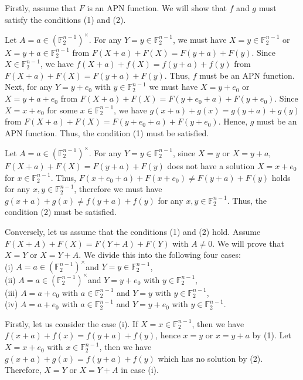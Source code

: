 \documentclass[10pt]{article}
\begin{document}
Firstly, assume that $F$ is an APN function. We will show that $f$ and $g$ must satisfy the conditions (1) and (2).

Let $A=a \in\left(\mathbb{F}_{2}^{n-1}\right)^{\times}$. For any $Y=y \in \mathbb{F}_{2}^{n-1}$, we must have $X=y \in \mathbb{F}_{2}^{n-1}$ or $X=y+a \in \mathbb{F}_{2}^{n-1}$ from $F(X+a)+F(X)=F(y+a)+F(y)$. Since $X \in \mathbb{F}_{2}^{n-1}$, we have $f(X+a)+f(X)=f(y+a)+f(y)$ from $F(X+a)+F(X)=F(y+a)+F(y)$. Thus, $f$ must be an APN function. Next, for any $Y=y+e_{0}$ with $y \in \mathbb{F}_{2}^{n-1}$ we must have $X=y+e_{0}$ or $X=y+a+e_{0}$ from $F(X+a)+F(X)=F\left(y+e_{0}+a\right)+F\left(y+e_{0}\right)$. Since $X=x+e_{0}$ for some $x \in \mathbb{F}_{2}^{n-1}$, we have $g(x+a)+g(x)=g(y+a)+g(y)$ from $F(X+a)+F(X)=F\left(y+e_{0}+a\right)+F\left(y+e_{0}\right)$. Hence, $g$ must be an APN function. Thus, the condition (1) must be satisfied.

Let $A=a \in\left(\mathbb{F}_{2}^{n-1}\right)^{\times}$. For any $Y=y \in \mathbb{F}_{2}^{n-1}$, since $X=y$ or $X=y+a$, $F(X+a)+F(X)=F(y+a)+F(y)$ does not have a solution $X=x+e_{0}$ for $x \in \mathbb{F}_{2}^{n-1}$. Thus, $F\left(x+e_{0}+a\right)+F\left(x+e_{0}\right) \neq F(y+a)+F(y)$ holds for any $x, y \in \mathbb{F}_{2}^{n-1}$, therefore we must have $g(x+a)+g(x) \neq f(y+a)+f(y)$ for any $x, y \in \mathbb{F}_{2}^{n-1}$. Thus, the condition (2) must be satisfied.

Conversely, let us assume that the conditions (1) and (2) hold. Assume $F(X+ A)+F(X)=F(Y+A)+F(Y)$ with $A \neq 0$. We will prove that $X=Y$ or $X=Y+A$. We divide this into the following four cases:\\
(i) $A=a \in\left(\mathbb{F}_{2}^{n-1}\right)^{\times}$and $Y=y \in \mathbb{F}_{2}^{n-1}$,\\
(ii) $A=a \in\left(\mathbb{F}_{2}^{n-1}\right)^{\times}$and $Y=y+e_{0}$ with $y \in \mathbb{F}_{2}^{n-1}$,\\
(iii) $A=a+e_{0}$ with $a \in \mathbb{F}_{2}^{n-1}$ and $Y=y$ with $y \in \mathbb{F}_{2}^{n-1}$,\\
(iv) $A=a+e_{0}$ with $a \in \mathbb{F}_{2}^{n-1}$ and $Y=y+e_{0}$ with $y \in \mathbb{F}_{2}^{n-1}$.

Firstly, let us consider the case (i). If $X=x \in \mathbb{F}_{2}^{n-1}$, then we have $f(x+a)+ f(x)=f(y+a)+f(y)$, hence $x=y$ or $x=y+a$ by (1). Let $X=x+e_{0}$ with $x \in \mathbb{F}_{2}^{n-1}$, then we have $g(x+a)+g(x)=f(y+a)+f(y)$ which has no solution by (2). Therefore, $X=Y$ or $X=Y+A$ in case (i).
\end{document}
